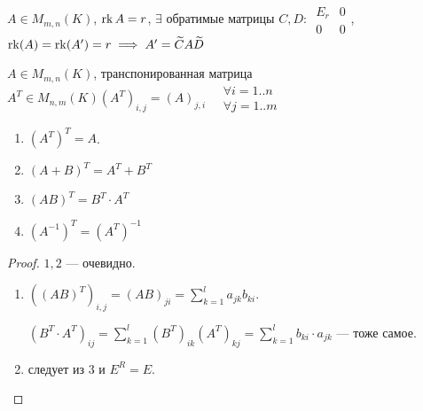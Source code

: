 \begin{remark}
    $A \in M_{m, n}(K)$,  $\operatorname{rk} A = r$,  $\exists $ обратимые матрицы  $C, D$:  $\begin{array}{|c|c|} E_r & 0 \\ \hline 0 & 0 \end{array}$, $\operatorname{rk}(A) = \operatorname{rk}(A') = r \implies A' = \widetilde{C} A \widetilde{D}$
\end{remark}
\begin{definition}
    $A \in M_{m, n}(K)$, транспонированная матрица  $A^T \in M_{n, m}(K) (A^T)_{i, j} = (A)_{j, i} \quad \substack{\forall i=1..n \\ \forall j=1..m}$
\end{definition}
\begin{properties}
    \begin{enumerate}
        \item $(A^T)^T = A$.
        \item  $(A+B)^T = A^T + B^T$
        \item  $(AB)^T = B^T \cdot A^T$
        \item  $(A^{-1})^T = (A^T)^{-1}$
    \end{enumerate}
\end{properties}
\begin{proof}
    $1, 2$ --- очевидно.
     \begin{enumerate}
         \addtocounter{enumi}{2}
     \item $((AB)^T)_{i, j} = (AB)_{ji} = \sum\limits_{k=1}^l a_{jk}b_{ki}$.

         $(B^T\cdot A^T)_{ij} = \sum\limits_{k=1}^l (B^T)_{ik} (A^T)_{kj} = \sum\limits_{k=1}^{l} b_{ki} \cdot a_{jk}$ --- тоже самое.
     \item следует из  $3$ и  $E^R =E$.
    \end{enumerate}
\end{proof}

